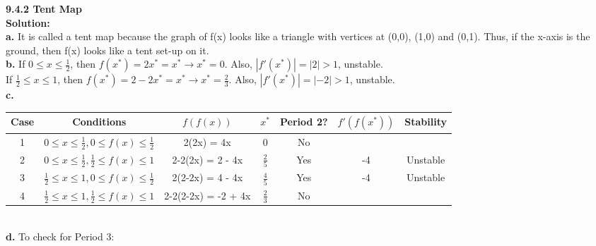 \documentclass[12pt]{article}
\begin{document}
{\bf 9.4.2 Tent Map}\\
{\bf Solution:}\\
\indent
{\bf a. } It is called a tent map because the graph of f(x) looks like a triangle with vertices at (0,0), (1,0) and (0,1). Thus, if the x-axis is the ground, then f(x) looks like a tent set-up on it.\\
\indent
{\bf b. } If $0 \leq x \leq \frac{1}{2}$, then $f(x^*) = 2x^* = x^* \rightarrow x^* = 0$. Also, $|f'(x^*)| = |2| > 1$, unstable.\\
\indent 
If $\frac{1}{2} \leq x \leq 1$, then $f(x^*) = 2- 2x^* = x^* \rightarrow x^* = \frac{2}{3}$. Also, $|f'(x^*)| =|- 2| > 1$, unstable.\\
 \indent
{\bf c. }
\begin{table}[h!]
  \centering
  \begin{tabular}{c|c||c|c|c|c|c}
    Case &Conditions & $f(f(x))$ & $x^*$ & Period 2? & $f'(f(x^*))$ & Stability\\
    \hline
    1&$0\leq x \leq \frac{1}{2}, 0\leq f(x) \leq \frac{1}{2}$  & 2(2x) = 4x & 0 & No & & \\
    2&$0\leq x \leq \frac{1}{2}, \frac{1}{2} \leq f(x) \leq 1$  & 2-2(2x) = 2 - 4x & $\frac{2}{5}$ & Yes &-4&Unstable\\
    3&$\frac{1}{2} \leq x \leq 1, 0\leq f(x) \leq \frac{1}{2}$  & 2(2-2x) = 4 - 4x & $\frac{4}{5}$ & Yes &-4&Unstable\\
    4&$\frac{1}{2} \leq x \leq 1, \frac{1}{2} \leq f(x) \leq 1$  & 2-2(2-2x) = -2 + 4x & $\frac{2}{3}$ & No & & \\
  \end{tabular}
\end{table}\\
{\bf d. }To check for Period 3:
\end{document}
